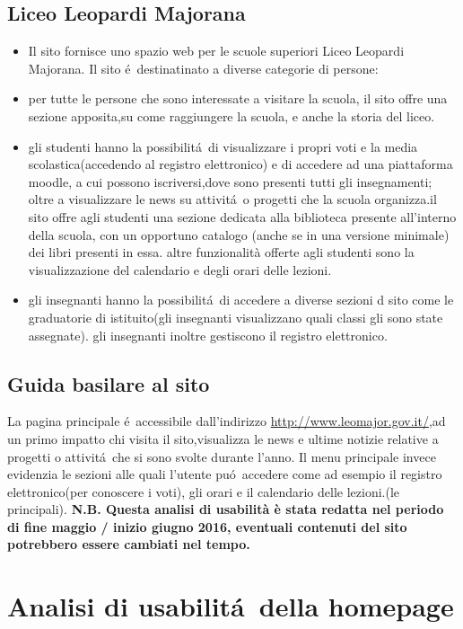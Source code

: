 \documentclass[12pt]{article}
\begin{document}
\subsection{Liceo Leopardi Majorana}
\begin{itemize}
	\item Il sito fornisce uno spazio web per le scuole superiori Liceo Leopardi Majorana. Il sito \'e\ destinatinato a diverse categorie di persone:
	\item per tutte le persone che sono interessate a visitare la scuola, il sito offre una sezione apposita,su come raggiungere la scuola, e anche la storia del liceo.
	\item gli studenti hanno la possibilit\'a\ di visualizzare i propri voti e la media scolastica(accedendo al registro elettronico) e di accedere ad una piattaforma moodle, a cui possono iscriversi,dove sono presenti tutti gli insegnamenti; oltre a visualizzare le news su attivit\'a\ o progetti che la scuola organizza.il sito offre agli studenti una sezione dedicata alla biblioteca presente all'interno della scuola, con un opportuno catalogo (anche se in una versione minimale) dei libri presenti in essa. altre funzionalità offerte agli studenti sono la visualizzazione del calendario e degli orari delle lezioni.
	\item gli insegnanti hanno la possibilit\'a\ di accedere a diverse sezioni d sito come le graduatorie di istituito(gli insegnanti visualizzano quali classi gli sono state assegnate). gli insegnanti inoltre gestiscono il registro elettronico.
\end{itemize}

\subsection{Guida basilare al sito}
La pagina principale \'e\ accessibile dall'indirizzo  \url{http://www.leomajor.gov.it/},ad un primo impatto chi visita il sito,visualizza le news e ultime notizie relative a progetti
o attivit\'a\ che si sono svolte durante l'anno. Il menu principale invece evidenzia le sezioni alle quali l'utente pu\'o\ accedere come ad esempio il registro elettronico(per conoscere i voti), gli orari e il calendario delle lezioni.(le principali).
\textbf{N.B. Questa analisi di usabilit\`a \`e stata redatta nel periodo di fine maggio / inizio giugno 2016, eventuali contenuti del sito potrebbero essere cambiati nel tempo.}


\newpage
\section{Analisi di usabilit\'a\ della homepage}
\end{document}
